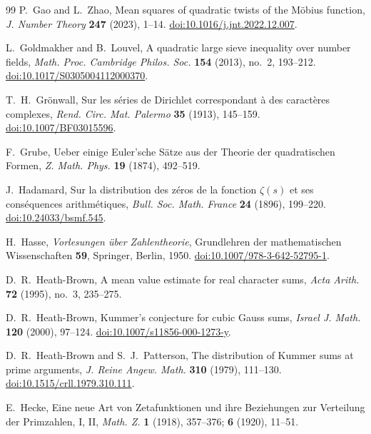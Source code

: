 \documentclass[11pt,a4paper]{article}
\numberwithin{equation}{section}
\numberwithin{figure}{section}
\theoremstyle{definition}
\theoremstyle{remark}
\begin{document}
\begin{thebibliography}{99}
P.~Gao and L.~Zhao,
Mean squares of quadratic twists of the M\"obius function,
\emph{J. Number Theory} \textbf{247} (2023), 1--14.
\href{https://doi.org/10.1016/j.jnt.2022.12.007}
{doi:10.1016/j.jnt.2022.12.007}.

L.~Goldmakher and B.~Louvel,
A quadratic large sieve inequality over number fields,
\emph{Math. Proc. Cambridge Philos. Soc.} \textbf{154} (2013),
no.~2, 193--212.
\href{https://doi.org/10.1017/S0305004112000370}
{doi:10.1017/S0305004112000370}.

T.~H.~Gr\"onwall,
Sur les s\'eries de Dirichlet correspondant \`a des caract\`eres complexes,
\emph{Rend. Circ. Mat. Palermo} \textbf{35} (1913), 145--159.
\href{https://doi.org/10.1007/BF03015596}{doi:10.1007/BF03015596}.

F.~Grube,
Ueber einige Euler'sche S\"atze aus der Theorie der quadratischen Formen,
\emph{Z. Math. Phys.} \textbf{19} (1874), 492--519.

J.~Hadamard,
Sur la distribution des z\'eros de la fonction $\zeta(s)$ et ses
cons\'equences arithm\'etiques,
\emph{Bull. Soc. Math. France} \textbf{24} (1896), 199--220.
\href{https://doi.org/10.24033/bsmf.545}{doi:10.24033/bsmf.545}.

{\raggedright
H.~Hasse,
\emph{Vorlesungen \"uber Zahlentheorie},
Grundlehren der mathematischen Wissenschaften \textbf{59},
Springer, Berlin, 1950.
\href{https://doi.org/10.1007/978-3-642-52795-1}
{doi:10.1007/978-3-642-52795-1}.
\par}

D.~R.~Heath-Brown,
A mean value estimate for real character sums,
\emph{Acta Arith.} \textbf{72} (1995), no.~3, 235--275.

D.~R.~Heath-Brown,
Kummer's conjecture for cubic Gauss sums,
\emph{Israel J. Math.} \textbf{120} (2000), 97--124.
\href{https://doi.org/10.1007/s11856-000-1273-y}
{doi:10.1007/s11856-000-1273-y}.

D.~R.~Heath-Brown and S.~J.~Patterson,
The distribution of Kummer sums at prime arguments,
\emph{J. Reine Angew. Math.} \textbf{310} (1979), 111--130.
\href{https://doi.org/10.1515/crll.1979.310.111}
{doi:10.1515/crll.1979.310.111}.

E.~Hecke,
Eine neue Art von Zetafunktionen und ihre Beziehungen zur Verteilung
der Primzahlen, I, II,
\emph{Math. Z.} \textbf{1} (1918), 357--376;
\textbf{6} (1920), 11--51.


\end{thebibliography}
\end{document}
